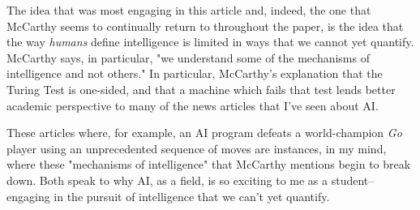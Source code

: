 \documentclass{article}
\begin{document}
  
  \graphicspath{{./images/}}
\par The idea that was most engaging in this article and, indeed, the one that McCarthy seems to continually return to throughout the paper, is the idea that the way \textit{humans} define intelligence is limited in ways that we cannot yet quantify. 
McCarthy says, in particular, "we understand some of the mechanisms of intelligence and not others." 
In particular, McCarthy's explanation that the Turing Test is one-sided, and that a machine which fails that test lends better academic perspective to many of the news articles that I've seen about AI. 
\par These articles where, for example, an AI program defeats a world-champion \textit{Go} player using an unprecedented sequence of moves \cite{GoAiWired} are instances, in my mind, where these "mechanisms of intelligence" that McCarthy mentions begin to break down. 
Both speak to why AI, as a field, is so exciting to me as a student--engaging in the pursuit of intelligence that we can't yet quantify.
\\[0.5in]

  
\end{document}
